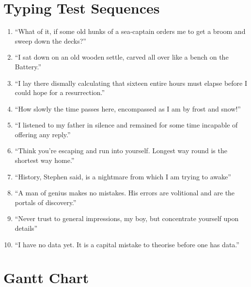 \documentclass{report}
\begin{document}
\chapter{Typing Test Sequences}
\label{appendix:test-sequences}
\normalsize
\begin{enumerate}
	\item ``What of it, if some old hunks of a sea-captain orders me to get a broom and sweep down the decks?'' \parencite{moby-dick}
	\item ``I sat down on an old wooden settle, carved all over like a bench on the Battery.'' \parencite{moby-dick}
	\item ``I lay there dismally calculating that sixteen entire hours must elapse before I could hope for a resurrection.'' \parencite{moby-dick}
	\item ``How slowly the time passes here, encompassed as I am by frost and snow!'' \parencite{frankenstein}
	\item ``I listened to my father in silence and remained for some time incapable of offering any reply.'' \parencite{frankenstein}
	\item ``Think you’re escaping and run into yourself. Longest way round is the shortest way home.'' \parencite{ulysses}
	\item ``History, Stephen said, is a nightmare from which I am trying to awake'' \parencite{ulysses}
	\item ``A man of genius makes no mistakes. His errors are volitional and are the portals of discovery.'' \parencite{ulysses}
	\item ``Never trust to general impressions, my boy, but concentrate yourself upon details'' \parencite{sherlock}
	\item ``I have no data yet. It is a capital mistake to theorise before one has data.'' \parencite{sherlock}
\end{enumerate}

\chapter{Gantt Chart}
\begin{landscape}
	
\end{landscape}

\newpage
\printbibliography[heading=bibintoc,title={References}]{}
\end{document}

